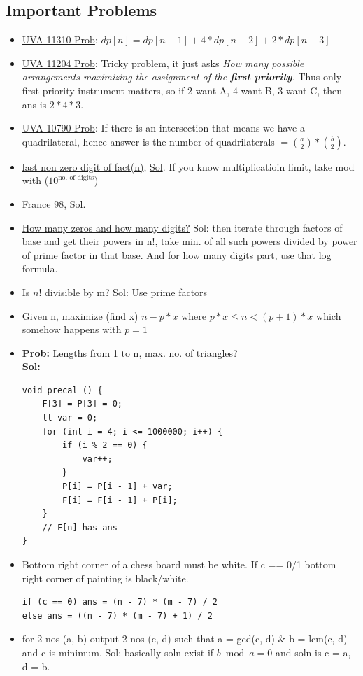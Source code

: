 \documentclass[8pt, a4paper, oneside, twocolumn]{extarticle}
\begin{document}
\subsection{Important Problems}
\begin{itemize}
	\item \href {https://uva.onlinejudge.org/external/113/11310.pdf}{UVA 11310 Prob}: $dp[n] = dp[n - 1] + 4 * dp[n - 2] + 2 * dp[n - 3]$
	\item \href {https://uva.onlinejudge.org/external/112/11204.pdf}{UVA 11204 Prob}: Tricky problem, it just asks \textit{How many possible arrangements maximizing the assignment of the \textbf{first priority}.} Thus only first priority instrument matters, so if 2 want A, 4 want B, 3 want C, then ans is $2 * 4 * 3$.
    \item \href {https://uva.onlinejudge.org/external/107/10790.pdf}{UVA 10790 Prob}: If there is an intersection that means we have a quadrilateral, hence answer is the number of quadrilaterals $ = \binom{a}{2} * \binom{b}{2}$.
    \item \href {https://uva.onlinejudge.org/external/5/568.pdf}{last non zero digit of fact(n)}, \href {https://gist.github.com/sourabh2311/3e7d2c8c905cce7f04eb86400d4aac35}{Sol}. If you know multiplicatioin limit, take mod with ($10^{\text{no. of digits}}$)
    \item \href {https://uva.onlinejudge.org/external/5/542.pdf}{France 98}, \href {https://gist.github.com/sourabh2311/94629bd0303d3c4f918bda3bdaf8e711}{Sol}.
    \item \href {https://uva.onlinejudge.org/external/100/10061.pdf}{How many zeros and how many digits?} Sol: then iterate through factors of base and get their powers in n!, take min. of all such powers divided by power of prime factor in that base. And for how many digits part, use that log formula.
    \item Is $n!$ divisible by m? Sol: Use prime factors
    \item Given n, maximize (find x) $n - p*x$ where $p*x \leq n < (p + 1)*x$ which somehow happens with $p = 1$
    \item \textbf{Prob: }Lengths from 1 to n, max. no. of triangles?
            \\\textbf{Sol: }\begin{verbatim}
void precal () {
    F[3] = P[3] = 0;
    ll var = 0;
    for (int i = 4; i <= 1000000; i++) {
        if (i % 2 == 0) {
            var++;
        }
        P[i] = P[i - 1] + var;
        F[i] = F[i - 1] + P[i];
    }
    // F[n] has ans
}
            \end{verbatim}
    \item Bottom right corner of a chess board must be white. If c == 0/1 bottom right corner of painting is black/white.
    \begin{verbatim}
if (c == 0) ans = (n - 7) * (m - 7) / 2
else ans = ((n - 7) * (m - 7) + 1) / 2
    \end{verbatim}
    \item for 2 nos (a, b) output 2 nos (c, d) such that a = gcd(c, d) \& b = lcm(c, d) and c is minimum. Sol: basically soln exist if $b \bmod a = 0$ and soln is c = a, d = b.
\end{itemize}
\end{document}
